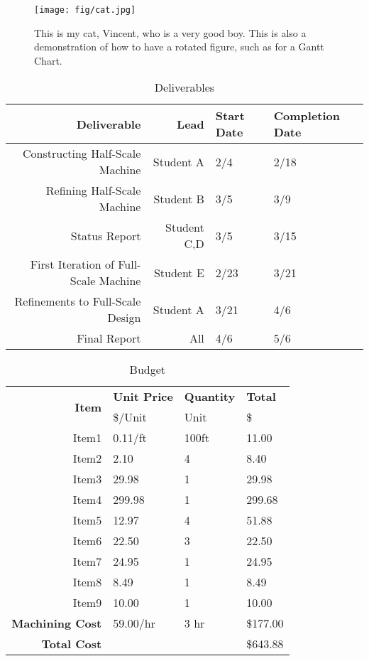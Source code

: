 \documentclass[hidelinks,11pt]{article}
\numberwithin{equation}{subsection}
\begin{document}
\begin{figure}[p]
  \centering
		\texttt{[image: fig/cat.jpg]} 
    \caption{This is my cat, Vincent, who is a very good boy. This is also a demonstration of how to have a rotated figure, such as for a Gantt Chart.}
    \label{fig:cat}
\end{figure}

\begin{table}[p]
    \centering
    \caption{Deliverables}
		\begin{tabular} { r | r l l}
			\textbf{Deliverable} & \textbf{Lead} & \textbf{Start Date} & \textbf{Completion Date} \\ \hline
			Constructing Half-Scale Machine & Student A & 2/4 & 2/18 \\
			Refining Half-Scale Machine & Student B & 3/5 & 3/9 \\
			Status Report & Student C,D & 3/5 & 3/15 \\
			First Iteration of Full-Scale Machine & Student E & 2/23 & 3/21 \\
			Refinements to Full-Scale Design & Student A & 3/21 & 4/6 \\
			Final Report & All & 4/6 & 5/6 \\
		\end{tabular}
		    \label{table:deliverables}

\end{table}


\begin{table}[p]
  \centering
    \caption{Budget}
		\begin{tabular}{r | l l l}
		\multirow{2}{*}{\textbf{Item}} & \textbf{Unit Price} & \textbf{Quantity} & \textbf{Total} \\
		 & \$/Unit & Unit & \$ \\ \hline
		 Item1  	& 0.11/ft   & 100ft & 11.00 \\
		 Item2 		& 2.10		& 4		& 8.40 \\
		 Item3		& 29.98		& 1		& 29.98 \\
		 Item4		& 299.98	& 1		& 299.68 \\
		 Item5 		& 12.97		& 4		& 51.88 \\
		 Item6		& 22.50		& 3		& 22.50 \\
		 Item7	    & 24.95		& 1		& 24.95 \\
		 Item8 		& 8.49		& 1		& 8.49 \\
		 Item9		& 10.00		& 1		& 10.00 \\
		 \hline
		 \textbf{Machining Cost}			&59.00/hr& 3 hr		&\$177.00 \\
		 \textbf{Total Cost}			&		& 	& \$643.88
		\end{tabular}
		\label{table:budget}

\end{table}


 
\end{document}
